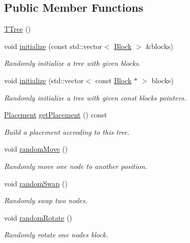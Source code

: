 \subsection*{Public Member Functions}
\begin{DoxyCompactItemize}
\item 
\hyperlink{classTTree_a86fa5aaf9e0e661ab3711fc70c99070e}{T\+Tree} ()
\item 
void \hyperlink{classTTree_a7be152bf003a3b7a41a0d2f2b8a60dcb}{initialize} (const std\+::vector$<$ \hyperlink{structBlock}{Block} $>$ \&blocks)
\begin{DoxyCompactList}\small\item\em Randomly initialize a tree with given blocks. \end{DoxyCompactList}\item 
void \hyperlink{classTTree_a39407b0d5bb0419d5930a264f909d240}{initialize} (std\+::vector$<$ const \hyperlink{structBlock}{Block} $\ast$ $>$ blocks)
\begin{DoxyCompactList}\small\item\em Randomly initialize a tree with given const blocks pointers. \end{DoxyCompactList}\item 
\hyperlink{classPlacement}{Placement} \hyperlink{classTTree_a7e34e70567be7961d4a5683010746aae}{get\+Placement} () const 
\begin{DoxyCompactList}\small\item\em Build a placement accroding to this tree. \end{DoxyCompactList}\item 
void \hyperlink{classTTree_a0b4e068faf77b43c5cb00a4e61a1c130}{random\+Move} ()
\begin{DoxyCompactList}\small\item\em Randomly move one node to another position. \end{DoxyCompactList}\item 
void \hyperlink{classTTree_aa5aab663511558247357bd9031f7f523}{random\+Swap} ()
\begin{DoxyCompactList}\small\item\em Randomly swap two nodes. \end{DoxyCompactList}\item 
void \hyperlink{classTTree_a72310af81f796797a623145656028bfc}{random\+Rotate} ()
\begin{DoxyCompactList}\small\item\em Randomly rotate one node\textquotesingle{}s block. \end{DoxyCompactList}\item 

\end{DoxyCompactItemize}
